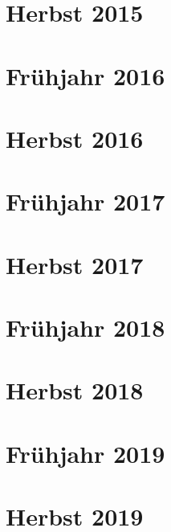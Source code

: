 \documentclass{lehramt-informatik-examen-sammlung}
\begin{document}
\section{Herbst 2015}


\section{Frühjahr 2016}


\section{Herbst 2016}


\section{Frühjahr 2017}


\section{Herbst 2017}


\section{Frühjahr 2018}


\section{Herbst 2018}


\section{Frühjahr 2019}


\section{Herbst 2019}

\end{document}
